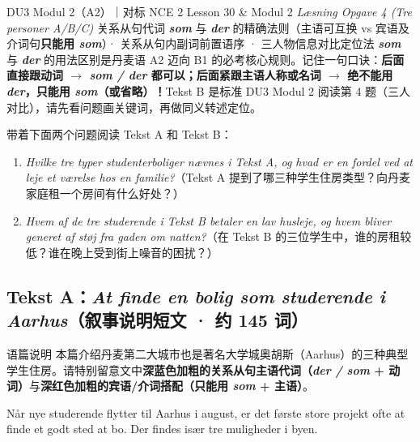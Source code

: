 {DU3 Modul 2（A2）｜对标 NCE 2 Lesson 30 \& Modul 2 \textit{Læsning Opgave 4 (Tre personer A/B/C)}}
{关系从句代词 \textbf{\textit{som}} 与 \textbf{\textit{der}} 的精确法则（主语可互换 vs 宾语及介词句\textbf{只能用 \textit{som}}）· 关系从句内副词前置语序 · 三人物信息对比定位法}
{\textbf{\textit{som}} 与 \textbf{\textit{der}} 的用法区别是丹麦语 A2 迈向 B1 的必考核心规则。记住一句口诀：\textbf{后面直接跟动词 $\rightarrow$ \textit{som / der} 都可以；后面紧跟主语人称或名词 $\rightarrow$ 绝不能用 \textit{der}，只能用 \textit{som}（或省略）！}Tekst B 是标准 DU3 Modul 2 阅读第 4 题（三人对比），请先看问题画关键词，再做同义转述定位。}

\begin{foerduleaeser}
带着下面两个问题阅读 Tekst A 和 Tekst B：
\begin{enumerate}
  \item \textit{Hvilke tre typer studenterboliger nævnes i Tekst A, og hvad er en fordel ved at leje et værelse hos en familie?}（Tekst A 提到了哪三种学生住房类型？向丹麦家庭租一个房间有什么好处？）
  \item \textit{Hvem af de tre studerende i Tekst B betaler en lav husleje, og hvem bliver generet af støj fra gaden om natten?}（在 Tekst B 的三位学生中，谁的房租较低？谁在晚上受到街上噪音的困扰？）
\end{enumerate}
\end{foerduleaeser}


\subsection*{Tekst A：\textit{At finde en bolig som studerende i Aarhus}（叙事说明短文 · 约 145 词）}

\begin{tipbox}{语篇说明}
本篇介绍丹麦第二大城市也是著名大学城奥胡斯（Aarhus）的三种典型学生住房。请特别留意文中\textbf{\color{NCDNavy}深蓝色加粗的关系从句主语代词（\textit{der / som} + 动词）}与\textbf{\color{NCDRed}深红色加粗的宾语/介词搭配（只能用 \textit{som} + 主语）}。
\end{tipbox}

Når nye studerende flytter til Aarhus i august, er det første store projekt ofte at finde et godt sted at bo. Der findes især tre muligheder i byen.

